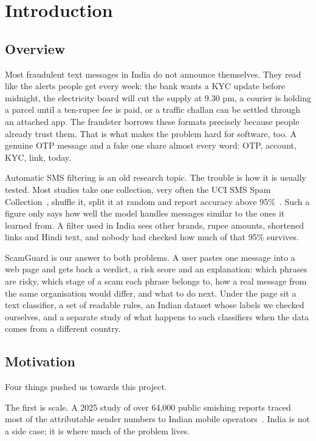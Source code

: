 \chapter{Introduction}
\section{Overview}
Most fraudulent text messages in India do not announce themselves. They read like the alerts people get every week: the bank wants a KYC update before midnight, the electricity board will cut the supply at 9.30 pm, a courier is holding a parcel until a ten-rupee fee is paid, or a traffic challan can be settled through an attached app. The fraudster borrows these formats precisely because people already trust them. That is what makes the problem hard for software, too. A genuine OTP message and a fake one share almost every word: OTP, account, KYC, link, today.

Automatic SMS filtering is an old research topic. The trouble is how it is usually tested. Most studies take one collection, very often the UCI SMS Spam Collection~\cite{almeida2011contributions}, shuffle it, split it at random and report accuracy above 95\%~\cite{almeida2013towards,roy2020deep}. Such a figure only says how well the model handles messages similar to the ones it learned from. A filter used in India sees other brands, rupee amounts, shortened links and Hindi text, and nobody had checked how much of that 95\% survives.

ScamGuard is our answer to both problems. A user pastes one message into a web page and gets back a verdict, a risk score and an explanation: which phrases are risky, which stage of a scam each phrase belongs to, how a real message from the same organisation would differ, and what to do next. Under the page sit a text classifier, a set of readable rules, an Indian dataset whose labels we checked ourselves, and a separate study of what happens to such classifiers when the data comes from a different country.

\section{Motivation}
Four things pushed us towards this project.

The first is scale. A 2025 study of over 64,000 public smishing reports traced most of the attributable sender numbers to Indian mobile operators~\cite{agarwal2025fishing}. India is not a side case; it is where much of the problem lives.

